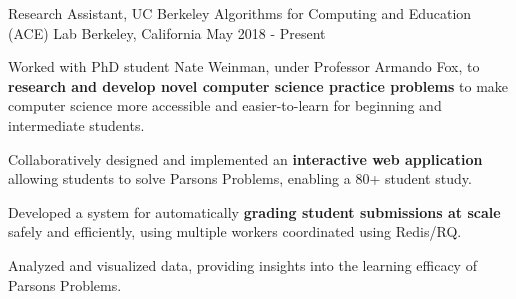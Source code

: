\begin{cventries}
    \cventry
      {Research Assistant, UC Berkeley}
      {Algorithms for Computing and Education (ACE) Lab}
      {Berkeley, California}
      {May 2018 - Present}
      {
        \begin{cvitems}
          \item Worked with PhD student Nate Weinman, under Professor Armando Fox, to \textbf{research and develop novel computer science practice problems}
          to make computer science more accessible and easier-to-learn for beginning and intermediate students.
          \item Collaboratively designed and implemented an \textbf{interactive web application} allowing students to solve Parsons Problems, enabling a 80+ student study. 
          \item Developed a system for automatically \textbf{grading student submissions at scale} safely and efficiently, using multiple workers coordinated using Redis/RQ.
          \item Analyzed and visualized data, providing insights into the learning efficacy of Parsons Problems.
        \end{cvitems}  
      }

\end{cventries}
